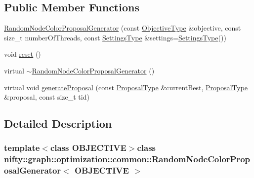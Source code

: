 \subsection*{Public Member Functions}
\begin{DoxyCompactItemize}
\item 
\hyperlink{classnifty_1_1graph_1_1optimization_1_1common_1_1RandomNodeColorProposalGenerator_a5adddcf4024d0a70787fdcd2847921fa}{Random\+Node\+Color\+Proposal\+Generator} (const \hyperlink{classnifty_1_1graph_1_1optimization_1_1common_1_1RandomNodeColorProposalGenerator_a84ad8b16bdc71fdac75166ad9b37a747}{Objective\+Type} \&objective, const size\+\_\+t number\+Of\+Threads, const \hyperlink{structnifty_1_1graph_1_1optimization_1_1common_1_1RandomNodeColorProposalGenerator_1_1SettingsType}{Settings\+Type} \&settings=\hyperlink{structnifty_1_1graph_1_1optimization_1_1common_1_1RandomNodeColorProposalGenerator_1_1SettingsType}{Settings\+Type}())
\item 
void \hyperlink{classnifty_1_1graph_1_1optimization_1_1common_1_1RandomNodeColorProposalGenerator_a2a1c2b4ecb0d9dab80a05d325d702afb}{reset} ()
\item 
virtual \hyperlink{classnifty_1_1graph_1_1optimization_1_1common_1_1RandomNodeColorProposalGenerator_a1070cacbabb3ea607a3c2379d2d70e90}{$\sim$\+Random\+Node\+Color\+Proposal\+Generator} ()
\item 
virtual void \hyperlink{classnifty_1_1graph_1_1optimization_1_1common_1_1RandomNodeColorProposalGenerator_aa4241c9267e225fe2db4d818be48e987}{generate\+Proposal} (const \hyperlink{classnifty_1_1graph_1_1optimization_1_1common_1_1ProposalGeneratorBase_a4700eb43beb708a77c5c34612039c715}{Proposal\+Type} \&current\+Best, \hyperlink{classnifty_1_1graph_1_1optimization_1_1common_1_1ProposalGeneratorBase_a4700eb43beb708a77c5c34612039c715}{Proposal\+Type} \&proposal, const size\+\_\+t tid)
\end{DoxyCompactItemize}


\subsection{Detailed Description}
\subsubsection*{template$<$class O\+B\+J\+E\+C\+T\+I\+V\+E$>$class nifty\+::graph\+::optimization\+::common\+::\+Random\+Node\+Color\+Proposal\+Generator$<$ O\+B\+J\+E\+C\+T\+I\+V\+E $>$}

